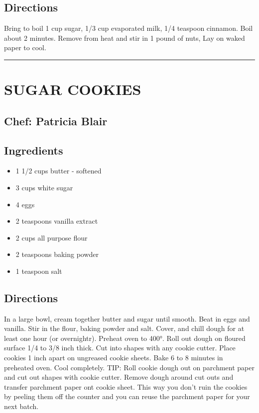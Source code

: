 \documentclass[
]{book}
\providecommand{\tightlist}{%
  \setlength{\itemsep}{0pt}\setlength{\parskip}{0pt}}
\begin{document}
\hypertarget{directions-105}{%
\subsection*{Directions}\label{directions-105}}


Bring to boil 1 cup sugar, 1/3 cup evaporated milk, 1/4 teaspoon cinnamon. Boil about 2 minutes. Remove from heat and stir in 1 pound of nuts, Lay on waked paper to cool.

\begin{center}\rule{0.5\linewidth}{0.5pt}\end{center}

\hypertarget{sugar-cookies}{%
\section*{SUGAR COOKIES}\label{sugar-cookies}}


\hypertarget{chef-patricia-blair-18}{%
\subsection*{Chef: Patricia Blair}\label{chef-patricia-blair-18}}


\hypertarget{ingredients-106}{%
\subsection*{Ingredients}\label{ingredients-106}}


\begin{itemize}
\tightlist
\item
  1 1/2 cups butter - softened
\item
  3 cups white sugar
\item
  4 eggs
\item
  2 teaspoons vanilla extract
\item
  2 cups all purpose flour
\item
  2 teaspoons baking powder
\item
  1 teaspoon salt
\end{itemize}

\hypertarget{directions-106}{%
\subsection*{Directions}\label{directions-106}}


In a large bowl, cream together butter and sugar until smooth. Beat in eggs and vanilla. Stir in the flour, baking powder and salt. Cover, and chill dough for at least one hour (or overnightr). Preheat oven to 400°. Roll out dough on floured surface 1/4 to 3/8 inch thick. Cut into shapes with any cookie cutter. Place cookies 1 inch apart on ungreased cookie sheets. Bake 6 to 8 minutes in preheated oven. Cool completely. TIP: Roll cookie dough out on parchment paper and cut out shapes with cookie cutter. Remove dough around cut outs and transfer parchment paper ont cookie sheet. This way you don't ruin the cookies by peeling them off the counter and you can reuse the parchment paper for your next batch.
\end{document}
